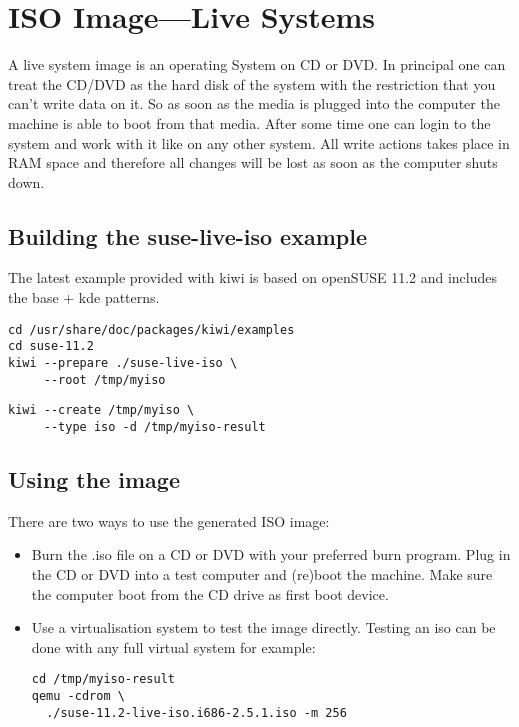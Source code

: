 \chapter{ISO Image---Live Systems}
\label{chapter:iso}
\minitoc

A live system image is an operating System on CD or DVD. In principal
one can treat the CD/DVD as the hard disk of the system with the
restriction that you can't write data on it. So as soon as the media
is plugged into the computer the machine is able to boot from that
media. After some time one can login to the system and work with it
like on any other system. All write actions takes place in RAM space
and therefore all changes will be lost as soon as the computer shuts
down.

\section{Building the suse-live-iso example}

The latest example provided with kiwi is based on openSUSE 11.2 and
includes the base + kde patterns.

\begin{Command}{12cm}
\begin{verbatim}
cd /usr/share/doc/packages/kiwi/examples
cd suse-11.2
kiwi --prepare ./suse-live-iso \
     --root /tmp/myiso
\end{verbatim}
\end{Command}

\begin{Command}{12cm}
\begin{verbatim}
kiwi --create /tmp/myiso \
     --type iso -d /tmp/myiso-result
\end{verbatim}
\end{Command}

\section{Using the image}

There are two ways to use the generated ISO image:
\begin{itemize}
\item Burn the .iso file on a CD or DVD with your preferred burn program.
      Plug in the CD or DVD into a test computer and (re)boot the machine.
      Make sure the computer boot from the CD drive as first boot device.
\item Use a virtualisation system to test the image directly. Testing an
      iso can be done with any full virtual system for example:

      \begin{Command}{12cm}
      \begin{verbatim}
cd /tmp/myiso-result
qemu -cdrom \
  ./suse-11.2-live-iso.i686-2.5.1.iso -m 256
      \end{verbatim}
      \end{Command}
\end{itemize}

